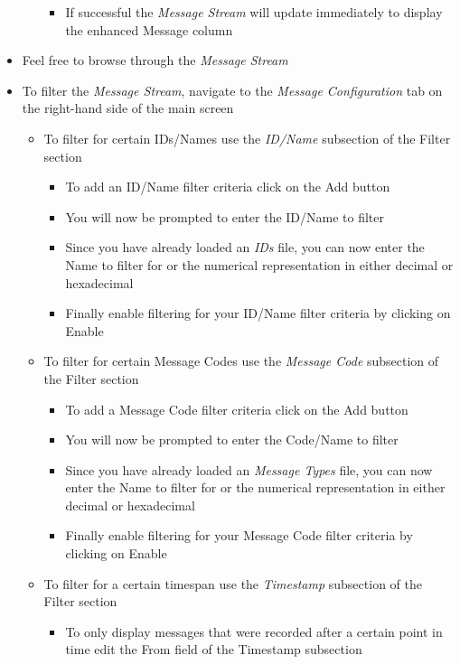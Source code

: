 \documentclass[12pt,a4paper]{scrartcl}
\begin{document}
\begin{itemize}
\begin{itemize}
\begin{itemize}
			\item If successful the \textit{Message Stream} will update immediately to display the enhanced Message column
		\end{itemize}
	\end{itemize}
	\item Feel free to browse through the \textit{Message Stream}
	\item To filter the \textit{Message Stream}, navigate to the \textit{Message Configuration} tab on the right-hand side of the main screen
	\begin{itemize}
		\item To filter for certain IDs/Names use the \textit{ID/Name} subsection of the Filter section
		\begin{itemize}
			\item To add an ID/Name filter criteria click on the Add button
			\item You will now be prompted to enter the ID/Name to filter
			\item Since you have already loaded an \textit{IDs} file, you can now enter the Name to filter for or the numerical representation in either decimal or hexadecimal
			\item Finally enable filtering for your ID/Name filter criteria by clicking on Enable
		\end{itemize}
		\item To filter for certain Message Codes use the \textit{Message Code} subsection of the Filter section
		\begin{itemize}
			\item To add a Message Code filter criteria click on the Add button
			\item You will now be prompted to enter the Code/Name to filter
			\item Since you have already loaded an \textit{Message Types} file, you can now enter the Name to filter for or the numerical representation in either decimal or hexadecimal
			\item Finally enable filtering for your Message Code filter criteria by clicking on Enable
		\end{itemize}
		\item To filter for a certain timespan use the \textit{Timestamp} subsection of the Filter section
		\begin{itemize}
			\item To only display messages that were recorded after a certain point in time edit the From field of the Timestamp subsection

\end{itemize}
\end{itemize}
\end{itemize}
\end{document}
